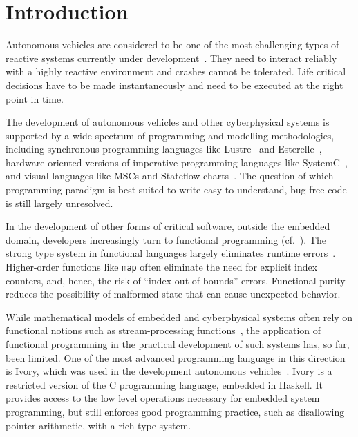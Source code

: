 \section{Introduction}

Autonomous vehicles are considered to be one of the most challenging
types of reactive systems currently under development~\cite{AlurMT16,
  WongpiromsarnKF11, RamanDSMS15}. They need to interact reliably with
a highly reactive environment and crashes cannot be tolerated.  Life
critical decisions have to be made instantaneously and need to be
executed at the right point in time.

The development of autonomous vehicles and other cyberphysical systems
is supported by a wide spectrum of
programming and modelling methodologies, 
including synchronous programming languages like Lustre~\cite{conf/popl/CaspiPHP87} 
and Esterelle~\cite{conf/concur/BerryC84},
hardware-oriented versions of imperative programming languages like
SystemC~\cite{open2006ieee}, and visual languages like MSCs and Stateflow-charts~\cite{harel2003message,journals/scp/Harel87}.
The question of which programming paradigm is best-suited to write
easy-to-understand, bug-free code is still largely unresolved.

In the development of other forms of critical software, outside the
embedded domain, developers increasingly turn to functional
programming (cf.~\cite{financialsoftware}).  The strong type system in functional
languages largely eliminates runtime errors~\cite{cardelli1996type}.
Higher-order functions like \texttt{map} often eliminate the need for
explicit index counters, and, hence, the risk of ``index out of
bounds'' errors.  Functional purity reduces the possibility of
malformed state that can cause unexpected behavior.

While mathematical models of embedded and cyberphysical systems often
rely on functional notions such as stream-processing
functions~\cite{DBLP:series/mcs/BroyS01,DBLP:conf/csdm/Broy12}, the
application of functional programming in the practical development of
such systems has, so far, been limited. One of the most advanced
programming language in this direction is Ivory, which was used in the
development autonomous vehicles~\cite{pike2014}.  Ivory is a
restricted version of the C programming language, embedded in Haskell.
It provides access to the low level operations necessary for embedded
system programming, but still enforces good programming practice, such
as disallowing pointer arithmetic, with a rich type system.

